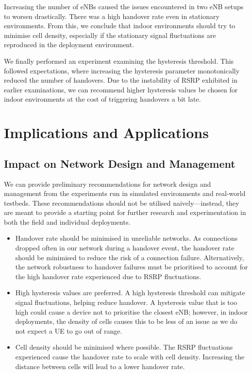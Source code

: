 Increasing the number of eNBs caused the issues encountered in two eNB setups to worsen drastically. There was a high handover rate even in stationary environments. From this, we conclude that indoor environments should try to minimise cell density, especially if the stationary signal fluctuations are reproduced in the deployment environment.

We finally performed an experiment examining the hysteresis threshold. This followed expectations, where increasing the hysteresis parameter monotonically reduced the number of handovers. Due to the instability of RSRP exhibited in earlier examinations, we can recommend higher hysteresis values be chosen for indoor environments at the cost of triggering handovers a bit late.

\section{Implications and Applications}
\subsection{Impact on Network Design and Management}
We can provide preliminary recommendations for network design and management from the experiments run in simulated environments and real-world testbeds. These recommendations should not be utilised naively—instead, they are meant to provide a starting point for further research and experimentation in both the field and individual deployments.

\begin{itemize}
    \item Handover rate should be minimised in unreliable networks. As connections dropped often in our network during a handover event, the handover rate should be minimised to reduce the risk of a connection failure. Alternatively, the network robustness to handover failures must be prioritised to account for the high handover rate experienced due to RSRP fluctuations.
    \item High hysteresis values are preferred. A high hysteresis threshold can mitigate signal fluctuations, helping reduce handover. A hysteresis value that is too high could cause a device not to prioritise the closest eNB; however, in indoor deployments, the density of cells causes this to be less of an issue as we do not expect a UE to go out of range.
    \item Cell density should be minimised where possible. The RSRP fluctuations experienced cause the handover rate to scale with cell density. Increasing the distance between cells will lead to a lower handover rate.
\end{itemize}

